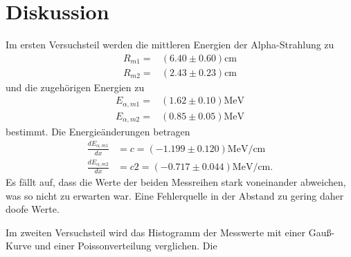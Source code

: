 \section{Diskussion}
\label{sec:Diskussion}

Im ersten Versuchsteil werden die mittleren Energien der Alpha-Strahlung zu
\begin{align*}
    R_{m1}=& (6.40 \pm 0.60)\si{\centi\meter}\\
    R_{m2}=& (2.43 \pm 0.23)\si{\centi\meter}
\end{align*}
und die zugehörigen Energien zu
\begin{align*}
    E_{\alpha, m1}=& (1.62 \pm 0.10)\si{\mega\eV}\\
    E_{\alpha, m2}=& (0.85 \pm 0.05)\si{\mega\eV}
\end{align*}
bestimmt.
Die Energieänderungen betragen
\begin{align*}
    \frac{dE_{\alpha, m1}}{dx} &= c = (-1.199 \pm  0.120)\si{\mega\eV\per\centi\meter}\\
    \frac{dE_{\alpha, m2}}{dx} &= c2 = (-0.717 \pm  0.044)\si{\mega\eV\per\centi\meter}.
\end{align*}
Es fällt auf, dass die Werte der beiden Messreihen stark voneinander abweichen, was so nicht zu erwarten war.
Eine Fehlerquelle in der 
Abstand zu gering daher doofe Werte.


Im zweiten Versuchsteil wird das Histogramm der Messwerte mit einer Gauß-Kurve und einer Poissonverteilung verglichen.
Die
